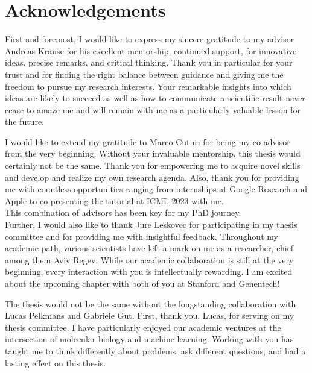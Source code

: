 
\bigskip

\begingroup
\let\clearpage\relax
\let\cleardoublepage\relax
\let\cleardoublepage\relax
\chapter*{Acknowledgements}

\def\thanks#1{%
\begingroup
\leftskip1em
\noindent #1
\par
\endgroup
}

First and foremost, I would like to express my sincere gratitude to my advisor Andreas Krause for his excellent mentorship, continued support, for innovative ideas, precise remarks, and critical thinking.
Thank you in particular for your trust and for finding the right balance between guidance and giving me the freedom to pursue my research interests.
Your remarkable insights into which ideas are likely to succeed as well as how to communicate a scientific result never cease to amaze me and will remain with me as a particularly valuable lesson for the future.

I would like to extend my gratitude to Marco Cuturi for being my co-advisor from the very beginning. 
Without your invaluable mentorship, this thesis would certainly not be the same. Thank you for empowering me to acquire novel skills and develop and realize my own research agenda.
Also, thank you for providing me with countless opportunities ranging from internships at Google Research and Apple to co-presenting the tutorial at ICML 2023 with me. \\
This combination of advisors has been key for my PhD journey. \\

Further, I would also like to thank Jure Leskovec for participating in my thesis committee and for providing me with insightful feedback. 
Throughout my academic path, various scientists have left a mark on me as a researcher, chief among them Aviv Regev. While our academic collaboration is still at the very beginning, every interaction with you is intellectually rewarding.
I am excited about the upcoming chapter with both of you at Stanford and Genentech!

 The thesis would not be the same without the longstanding collaboration with Lucas Pelkmans and Gabriele Gut. First, thank you, Lucas, for serving on my thesis committee.
I have particularly enjoyed our academic ventures at the intersection  of molecular biology and machine learning. Working with you has taught me to think differently about problems, ask different questions, and had a lasting effect on this thesis.


